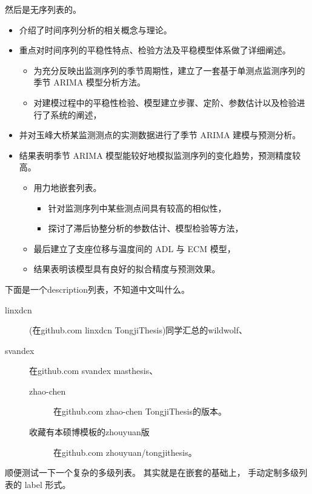 \documentclass[UTF8,AutoFakeBold,zihao=-4,scheme=chinese]{ctexart}
\begin{document}
然后是无序列表的。
\begin{itemize}
  \item 介绍了时间序列分析的相关概念与理论。
  \item 重点对时间序列的平稳性特点、检验方法及平稳模型体系做了详细阐述。
  \begin{itemize}
    \item 为充分反映出监测序列的季节周期性，建立了一套基于单测点监测序列的季节 ARIMA 模型分析方法。
    \item 对建模过程中的平稳性检验、模型建立步骤、定阶、参数估计以及检验进行了系统的阐述，
  \end{itemize}
  \item 并对玉峰大桥某监测测点的实测数据进行了季节 ARIMA 建模与预测分析。
  \item 结果表明季节 ARIMA 模型能较好地模拟监测序列的变化趋势，预测精度较高。
  \begin{itemize}
    \item 用力地嵌套列表。
    \begin{itemize}
      \item 针对监测序列中某些测点间具有较高的相似性，
      \item 探讨了滞后协整分析的参数估计、模型检验等方法，
    \end{itemize}
    \item 最后建立了支座位移与温度间的 ADL 与 ECM 模型，
    \item 结果表明该模型具有良好的拟合精度与预测效果。
  \end{itemize}
\end{itemize}

下面是一个description列表，不知道中文叫什么。

\begin{description}
  \item [linxdcn] (在github.com linxdcn TongjiThesis)同学汇总的wildwolf、
  \item [svandex] 在github.com svandex masthesis、
  \begin{description}
    \item [zhao-chen] 在github.com zhao-chen TongjiThesis的版本。
    \item [收藏有本硕博模板的zhouyuan版] 在github.com zhouyuan/tongjithesis。
  \end{description}
\end{description}

\zhlipsum[33]

顺便测试一下一个复杂的多级列表。
其实就是在嵌套的基础上， 手动定制多级列表的 label 形式。
\end{document}

